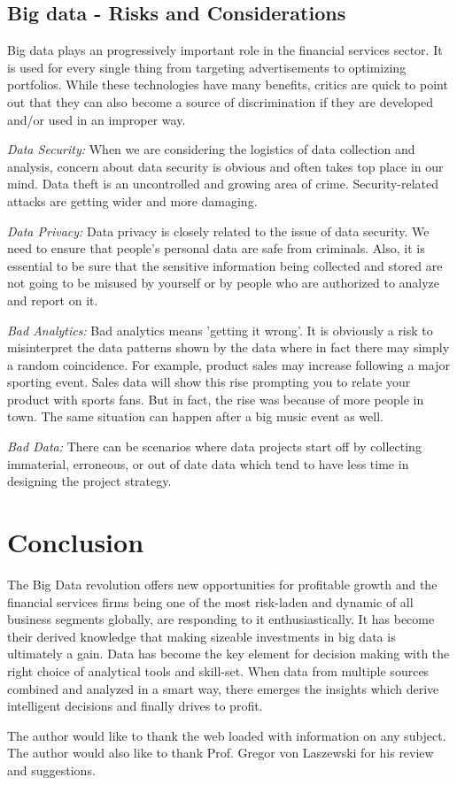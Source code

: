 \documentclass[sigconf]{acmart}
\begin{document}
\subsection{Big data - Risks and Considerations}

Big data plays an progressively important role in the financial services sector. It is used for every single thing from targeting advertisements to optimizing portfolios. While these technologies have many benefits, critics are quick to point out that they can also become a source of discrimination if they are developed and/or used in an improper way\cite{risk-with-bigdata}.

\textit{Data Security:} When we are considering the logistics of data collection and analysis, concern about data security is obvious and often takes top place in our mind. Data theft is an uncontrolled and growing area of crime. Security-related attacks are getting wider and more damaging\cite{5risks-bigdata}.

\textit{Data Privacy:} Data privacy is closely related to the issue of data security. We need to ensure that people's personal data are safe from criminals. Also, it is essential to be sure that the sensitive information being collected and stored are not going to be misused by yourself or by people who are authorized to analyze and report on it\cite{5risks-bigdata}.

\textit{Bad Analytics:} Bad analytics means 'getting it wrong'. It is obviously a risk to misinterpret the data patterns shown by the data where in fact there may simply a random coincidence. For example, product sales may increase following a major sporting event. Sales data will show this rise prompting you to relate your product with sports fans. But in fact, the rise was because of more people in town. The same situation can happen after a big music event as well\cite{5risks-bigdata}.

\textit{Bad Data:} There can be scenarios where data projects start off by collecting immaterial, erroneous, or out of date data which tend to have less time in designing the project strategy\cite{5risks-bigdata}.


\section{Conclusion}
The Big Data revolution offers new opportunities for profitable growth and the financial services firms being one of the most risk-laden and dynamic of all business segments globally, are responding to it enthusiastically. It has become their derived knowledge that making sizeable investments in big data is ultimately a gain. Data has become the key element for decision making with the right choice of analytical tools and skill-set. When data from multiple sources combined and analyzed in a smart way, there emerges the insights which derive intelligent decisions and finally drives to profit.

\begin{acks}

The author would like to thank the web loaded with information on any subject. The author would also like to thank Prof. Gregor von Laszewski for his review and suggestions.

\end{acks}



 
\end{document}
